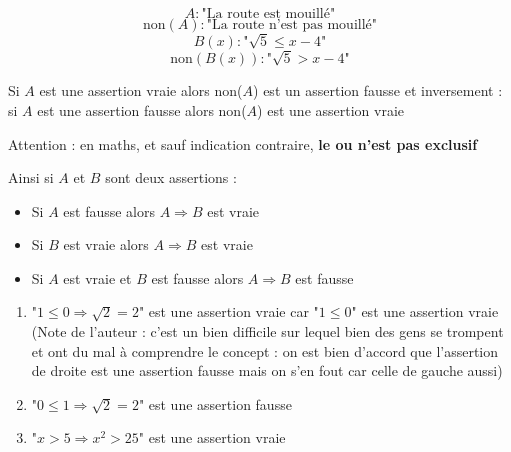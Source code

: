 \begin{exemples}
$$A : \text{"La route est mouillé"}$$
$$\text{non}(A) : \text{"La route n'est pas mouillé"}$$
$$B(x) : \text{"}\sqrt{5} \leq x-4\text{"}$$
$$\text{non}(B(x)) : \text{"}\sqrt{5} > x-4\text{"}$$
\end{exemples}
Si $A$ est une assertion vraie alors non($A$) est un assertion fausse et inversement : si $A$ est une assertion fausse alors non($A$) est une assertion vraie\newline


\newline

Attention : en maths, et sauf indication contraire, \textbf{le ou n'est pas exclusif}\newline

\newline

Ainsi si $A$ et $B$ sont deux assertions : \begin{itemize} \item Si $A$ est fausse alors $A \Rightarrow B$ est vraie \item Si $B$ est vraie alors $A \Rightarrow B$ est vraie \item Si $A$ est vraie et $B$ est fausse alors $A \Rightarrow B$ est fausse \end{itemize}

\begin{exemples}
\begin{enumerate}
\item "$1 \leq 0 \Rightarrow \sqrt{2} = 2$" est une assertion vraie car "$1 \leq 0$" est une assertion vraie (Note de l'auteur : c'est un bien difficile sur lequel bien des gens se trompent et ont du mal à comprendre le concept : on est bien d'accord que l'assertion de droite est une assertion fausse mais on s'en fout car celle de gauche aussi)
\item "$0 \leq 1 \Rightarrow \sqrt{2} = 2$" est une assertion fausse 
\item "$x > 5 \Rightarrow x^2 > 25$" est une assertion vraie
\end{enumerate}
\end{exemples}
\newline 

